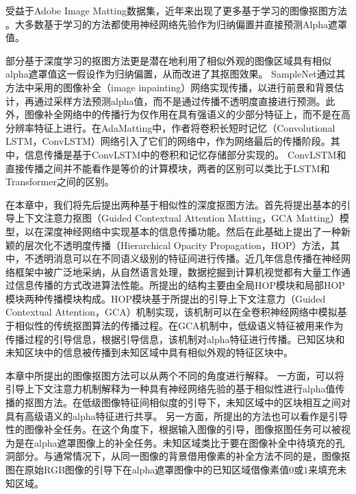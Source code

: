 受益于Adobe Image Matting数据集\cite{xu2017deep}，近年来出现了更多基于学习的图像抠图方法 \cite{xu2017deep,lutz2018alphagan,lu2019indices,samplenet,cai2019disentangled,hou2019context}。大多数基于学习的方法都使用神经网络先验作为归纳偏置并直接预测Alpha遮罩值。

部分基于深度学习的抠图方法\cite{samplenet,cai2019disentangled}更是潜在地利用了相似外观的图像区域具有相似alpha遮罩值这一假设作为归纳偏置，从而改进了其抠图效果。
SampleNet\cite{samplenet}通过其方法中采用的图像补全（image inpainting）网络\cite{yu2018generative}实现传播，以进行前景和背景估计，再通过采样方法预测alpha值，而不是通过传播不透明度直接进行预测。此外，图像补全网络中的传播行为仅作用在具有强语义的少部分特征上，而不是在高分辨率特征上进行。在AdaMatting\cite{cai2019disentangled}中，作者将卷积长短时记忆（Convolutional LSTM，ConvLSTM）网络\cite{xingjian2015convolutional}引入了它们的网络中，作为网络最后的传播阶段。其中，信息传播是基于ConvLSTM中的卷积和记忆存储部分实现的。
ConvLSTM和直接传播之间并不能看作是等价的计算模块，两者的区别可以类比于LSTM\cite{hochreiter1997long}和Transformer\cite{vaswani2017attention}之间的区别。

在本章中，我们将先后提出两种基于相似性的深度抠图方法。首先将提出基本的引导上下文注意力抠图（Guided Contextual Attention Matting，GCA Matting）模型，以在深度神经网络中实现基本的信息传播功能。然后在此基础上提出了一种新颖的层次化不透明度传播（Hierarchical Opacity Propagation，HOP）方法，其中，不透明消息可以在不同语义级别的特征间进行传播。近几年信息传播在神经网络框架中被广泛地采纳，从自然语言处理\cite{vaswani2017attention,yang2019xlnet}，数据挖掘\cite{kipf2016semi,velivckovic2017graph}到计算机视觉\cite{yu2018generative,wang2018non}都有大量工作通过信息传播的方式改进算法性能。所提出的结构主要由全局HOP模块和局部HOP模块两种传播模块构成。HOP模块基于所提出的引导上下文注意力（Guided Contextual Attention，GCA）机制实现，该机制可以在全卷积神经网络中模拟基于相似性的传统抠图算法的传播过程。在GCA机制中，低级语义特征被用来作为传播过程的引导信息，根据引导信息，该机制对alpha特征进行传播。已知区块和未知区块中的信息被传播到未知区域中具有相似外观的特征区块中。

本章中所提出的图像抠图方法可以从两个不同的角度进行解释。 一方面，可以将引导上下文注意力机制解释为一种具有神经网络先验的基于相似性进行alpha值传播的抠图方法。在低级图像特征间相似度的引导下，未知区域中的区块相互之间对具有高级语义的alpha特征进行共享。
另一方面，所提出的方法也可以看作是引导性的图像补全任务。在这个角度下，根据输入图像的引导，图像抠图任务可以被视为是在alpha遮罩图像上的补全任务。未知区域类比于要在图像补全中待填充的孔洞部分。与通常情况下，从同一图像的背景借用像素的补全方法不同的是，图像抠图在原始RGB图像的引导下在alpha遮罩图像中的已知区域借像素值$ 0 $或$ 1 $来填充未知区域。


